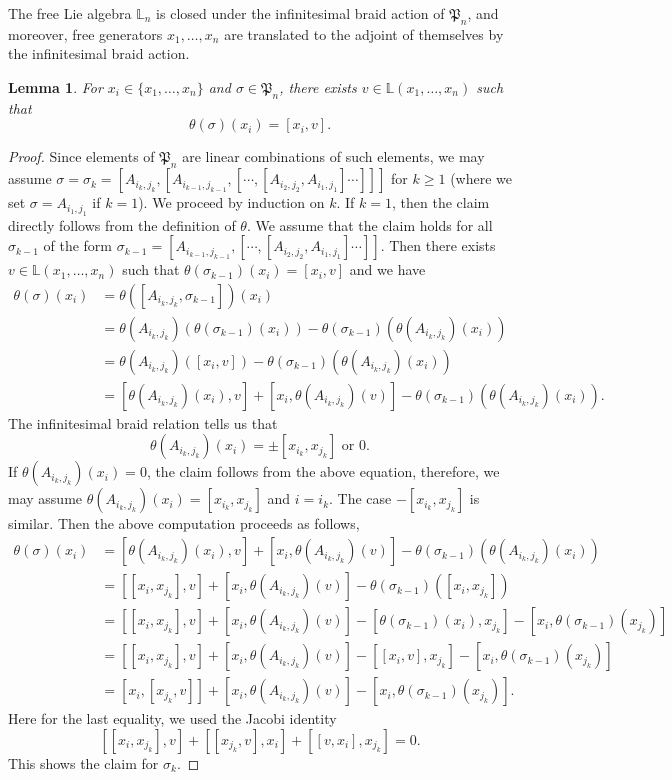 \documentclass[a4paper,12pt]{article}
\newtheorem{lem}[thm]{Lemma}
\theoremstyle{definition}
\theoremstyle{remark}
\begin{document}
The free Lie algebra $\mathbb{L}_{n}$
is closed under the
infinitesimal braid action of $\mathfrak{P}_{n}$,
and moreover, free generators $x_{1},\ldots,x_{n}$
are translated to the adjoint of themselves by the infinitesimal braid action.
\begin{lem}\label{lem:purebraid}
For $x_{i}\in \{x_{1},\ldots,x_{n}\}$ and $\sigma\in \mathfrak{P}_{n}$,
there exists $v\in \mathbb{L}(x_{1},\ldots,x_{n})$ such that 
\[
	\theta(\sigma)(x_{i})=[x_{i},v].
\]
\end{lem}
\begin{proof}
Since elements of $\mathfrak{P}_{n}$
are linear combinations of such elements,
we may assume 
$\sigma=\sigma_{k}=[A_{i_{k},j_{k}},[A_{i_{k-1},j_{k-1}},[\cdots,[A_{i_{2},j_{2}},A_{i_{1},j_{1}}]\cdots]]]$
for $k\ge 1$ (where 
we set $\sigma=A_{i_{1},j_{1}}$ if $k=1$).
We proceed by induction on $k$.
If $k=1$, then the claim directly follows from the definition of $\theta$.
We assume that the claim holds for all $\sigma_{k-1}$ of the form $\sigma_{k-1}=[A_{i_{k-1},j_{k-1}},[\cdots,[A_{i_{2},j_{2}},A_{i_{1},j_{1}}]\cdots]]$.
Then there exists $v\in \mathbb{L}(x_{1},\ldots,x_{n})$
such that $\theta(\sigma_{k-1})(x_{i})=[x_{i},v]$
and we have
\begin{align*}
\theta(\sigma)(x_{i})&=\theta([A_{i_{k},j_{k}},\sigma_{k-1}])(x_{i})\\
&=\theta(A_{i_{k},j_{k}})(\theta(\sigma_{k-1})(x_{i}))-\theta(\sigma_{k-1})(\theta(A_{i_{k},j_{k}})(x_{i}))\\
&=\theta(A_{i_{k},j_{k}})([x_{i},v])-\theta(\sigma_{k-1})(\theta(A_{i_{k},j_{k}})(x_{i}))\\
&=[\theta(A_{i_{k},j_{k}})(x_{i}),v]+[x_{i},\theta(A_{i_{k},j_{k}})(v)]-\theta(\sigma_{k-1})(\theta(A_{i_{k},j_{k}})(x_{i})).
\end{align*}
The infinitesimal braid relation tells us that 
\[
	\theta(A_{i_{k},j_{k}})(x_{i})=\pm[x_{i_{k}},x_{j_{k}}]\text{ or }0.
\]
If $\theta(A_{i_{k},j_{k}})(x_{i})=0$, the claim follows from the above equation,
therefore, we may assume $\theta(A_{i_{k},j_{k}})(x_{i})=[x_{i_{k}},x_{j_{k}}]$
and $i=i_{k}$. 
The case $-[x_{i_{k}},x_{j_{k}}]$ is similar.
Then the above computation proceeds as follows, 
\begin{align*}
\theta(\sigma)(x_{i})&=[\theta(A_{i_{k},j_{k}})(x_{i}),v]+[x_{i},\theta(A_{i_{k},j_{k}})(v)]-\theta(\sigma_{k-1})(\theta(A_{i_{k},j_{k}})(x_{i}))\\
&=[[x_{i},x_{j_{k}}],v]	+[x_{i},\theta(A_{i_{k},j_{k}})(v)]-\theta(\sigma_{k-1})([x_{i},x_{j_{k}}])\\
&=[[x_{i},x_{j_{k}}],v]	+[x_{i},\theta(A_{i_{k},j_{k}})(v)]-[\theta(\sigma_{k-1})(x_{i}),x_{j_{k}}]
-[x_{i},\theta(\sigma_{k-1})(x_{j_{k}})]\\
&=[[x_{i},x_{j_{k}}],v]	+[x_{i},\theta(A_{i_{k},j_{k}})(v)]-[[x_{i},v],x_{j_{k}}]
-[x_{i},\theta(\sigma_{k-1})(x_{j_{k}})]\\
&=[x_{i},[x_{j_{k}},v]]
+[x_{i},\theta(A_{i_{k},j_{k}})(v)]
-[x_{i},\theta(\sigma_{k-1})(x_{j_{k}})].
\end{align*}
Here for the last equality, we used the Jacobi identity
\[
[[x_{i},x_{j_{k}}],v]+[[x_{j_{k}},v],x_{i}]+[[v,x_{i}],x_{j_{k}}]=0.
\]
This shows the claim for $\sigma_{k}$.
\end{proof}
\end{document}
